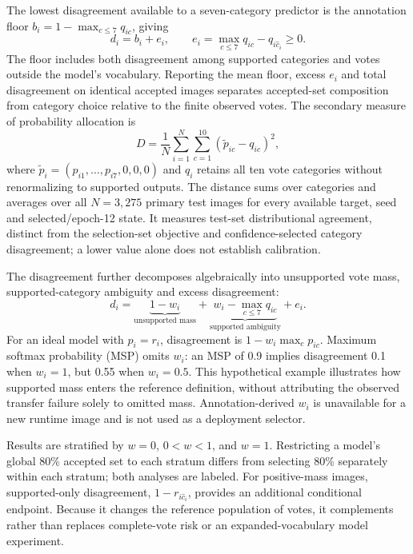 \documentclass[pdflatex,sn-mathphys-num]{sn-jnl}
\begin{document}
The lowest disagreement available to a seven-category predictor is the annotation floor $b_i=1-\max_{c\leq7}q_{ic}$, giving
\begin{equation}
d_i=b_i+e_i,\qquad e_i=\max_{c\leq7}q_{ic}-q_{i\hat c_i}\geq0.
\label{eq:decomposition}
\end{equation}
The floor includes both disagreement among supported categories and votes outside the model's vocabulary. Reporting the mean floor, excess $e_i$ and total disagreement on identical accepted images separates accepted-set composition from category choice relative to the finite observed votes. The secondary measure of probability allocation is
\begin{equation}
D=\frac{1}{N}\sum_{i=1}^{N}\sum_{c=1}^{10}(\tilde p_{ic}-q_{ic})^2,
\end{equation}
where $\tilde p_i=(p_{i1},\ldots,p_{i7},0,0,0)$ and $q_i$ retains all ten vote categories without renormalizing to supported outputs. The distance sums over categories and averages over all $N=3,275$ primary test images for every available target, seed and selected/epoch-12 state. It measures test-set distributional agreement, distinct from the selection-set objective and confidence-selected category disagreement; a lower value alone does not establish calibration.

The disagreement further decomposes algebraically into unsupported vote mass, supported-category ambiguity and excess disagreement:
\begin{equation}
d_i=\underbrace{1-w_i}_{\text{unsupported mass}}+
\underbrace{w_i-\max_{c\leq7}q_{ic}}_{\text{supported ambiguity}}+e_i.
\label{eq:threeparts}
\end{equation}
For an ideal model with $p_i=r_i$, disagreement is $1-w_i\max_c p_{ic}$. Maximum softmax probability (MSP) omits $w_i$: an MSP of 0.9 implies disagreement 0.1 when $w_i=1$, but 0.55 when $w_i=0.5$. This hypothetical example illustrates how supported mass enters the reference definition, without attributing the observed transfer failure solely to omitted mass. Annotation-derived $w_i$ is unavailable for a new runtime image and is not used as a deployment selector.

Results are stratified by $w=0$, $0<w<1$, and $w=1$. Restricting a model's global 80\% accepted set to each stratum differs from selecting 80\% separately within each stratum; both analyses are labeled. For positive-mass images, supported-only disagreement, $1-r_{i\hat c_i}$, provides an additional conditional endpoint. Because it changes the reference population of votes, it complements rather than replaces complete-vote risk or an expanded-vocabulary model experiment.
\end{document}
